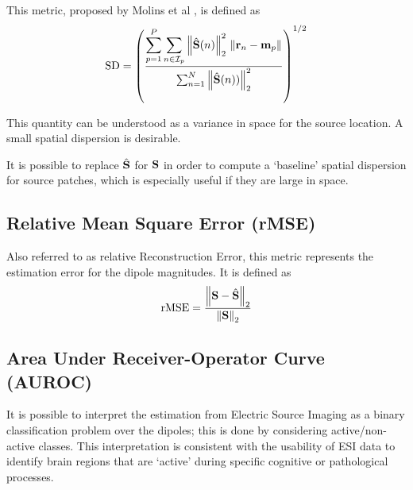 This metric, proposed by Molins et al \cite{molins2008quantification}, is defined as
\begin{equation}
\text{SD}
=
\left( 
\frac{ \displaystyle
\sum_{p=1}^P \sum_{n\in \mathcal{I}_p} \left\lVert \hat{\mathbf{S}}(n) \right\rVert_2^2\, \left\lVert \mathbf{r}_n-\mathbf{m}_p \right\rVert }{\sum_{n=1}^N \left\lVert \hat{\mathbf{S}}(n)) \right\rVert_2^2}
 \right)^{1/2}
\end{equation}

This quantity can be understood as a variance in space for the source location. 
%
A small spatial dispersion is desirable.

It is possible to replace $\hat{\mathbf{S}}$ for ${\mathbf{S}}$ in order to compute a `baseline' spatial dispersion for source patches, which is especially useful if they are large in space.

\subsection{Relative Mean Square Error (rMSE)}

Also referred to as relative Reconstruction Error, this metric represents the estimation error for the dipole magnitudes. 
%
It is defined as
\begin{equation}
\text{rMSE} = 
\frac{\left\lVert \mathbf{S} - \hat{\mathbf{S}} \right\rVert_2}{\left\lVert \mathbf{S} \right\rVert_2}
\end{equation}

\subsection{Area Under Receiver-Operator Curve (AUROC)}

It is possible to interpret the estimation from Electric Source Imaging as a binary classification problem over the dipoles; this is done by considering active/non-active classes.
%
This interpretation is consistent with the usability of ESI data to identify brain regions that are `active' during specific cognitive or pathological processes.

